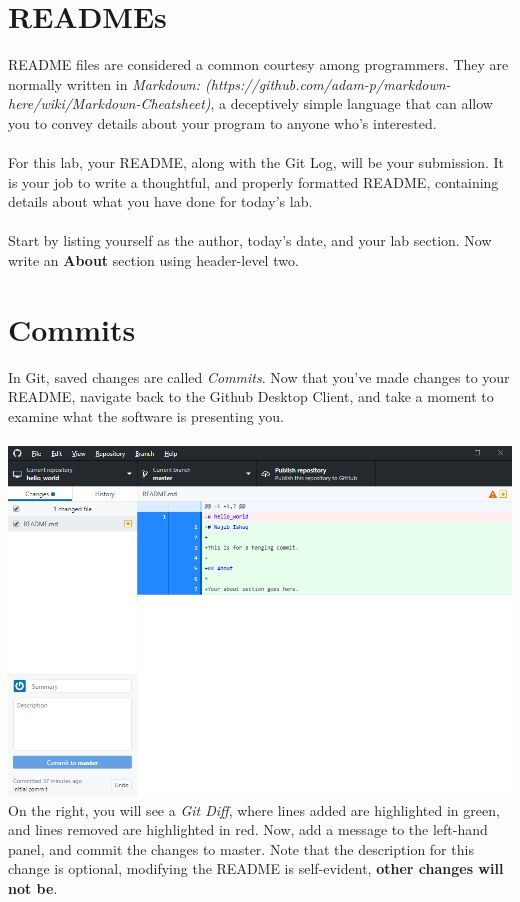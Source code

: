 \documentclass[12pt, letter]{article}
\begin{document}
    \section{READMEs}
    README files are considered a common courtesy among programmers. They are normally written in \emph{Markdown: (https://github.com/adam-p/markdown-here/wiki/Markdown-Cheatsheet)}, a deceptively simple language that can allow you to convey details about your program to anyone who's interested. 
    \\ \\
    For this lab, your README, along with the Git Log, will be your submission. It is your job to write a thoughtful, and properly formatted README, containing details about what you have done for today's lab.
    \\ \\ 
    Start by listing yourself as the author, today's date, and your lab section. Now write an \textbf{About} section using header-level two. 

    \section{Commits}
    In Git, saved changes are called \emph{Commits}. Now that you've made changes to your README, navigate back to the Github Desktop Client, and take a moment to examine what the software is presenting you. \\ \\ %
    \includegraphics{screenshots/shot4.bmp}
    \\
    On the right, you will see a \emph{Git Diff}, where lines added are highlighted in green, and lines removed are highlighted in red. Now, add a message to the left-hand panel, and commit the changes to master. Note that the description for this change is optional, modifying the README is self-evident, \textbf{other changes will not be}.
\end{document}
